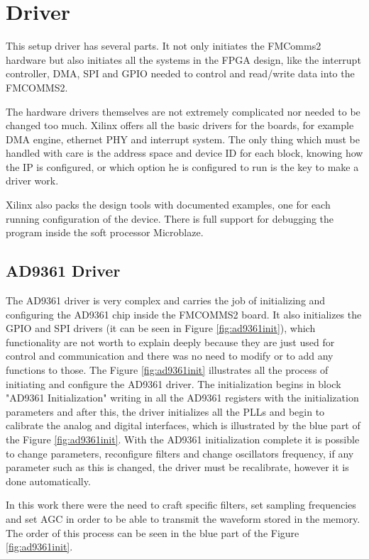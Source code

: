 \section{Driver}
\label{impl:driver}

This setup driver has several parts. It not only initiates the FMComms2 hardware
but also initiates all the systems in the FPGA design, like the interrupt
controller, DMA, SPI and GPIO needed to control and read/write data into the
FMCOMMS2.

The hardware drivers themselves are not extremely complicated nor needed to be
changed too much. Xilinx offers all the basic drivers for the boards, for
example DMA engine, ethernet PHY and interrupt system. The only thing which must
be handled with care is the address space and device ID for each block, knowing
how the IP is configured, or which option he is configured to run is the key to
make a driver work.

Xilinx also packs the design tools with documented examples, one for each
running configuration of the device. There is full support for debugging the
program inside the soft processor Microblaze.

\subsection{AD9361 Driver}

The AD9361 driver is very complex and carries the job of initializing and
configuring the AD9361 chip inside the FMCOMMS2 board. It also initializes the
GPIO and SPI drivers (it can be seen in Figure \ref{fig:ad9361init}), which
functionality are not worth to explain deeply because they are just used for
control and communication and there was no need to modify or to add any
functions to those. The Figure \ref{fig:ad9361init} illustrates all the process
of initiating and configure the AD9361 driver.
The initialization begins in block "AD9361 Initialization" writing in all the
AD9361 registers with the initialization parameters and after this, the driver
initializes all the PLLs and begin to calibrate the analog and digital
interfaces, which is illustrated by the blue part of the Figure
\ref{fig:ad9361init}. With the AD9361 initialization complete it is possible to
change parameters, reconfigure filters and  change oscillators frequency, if any
parameter such as this is changed, the driver must be recalibrate, however it is
done automatically.

In this work there were the need to craft specific filters, set sampling
frequencies and set AGC in order to be able to transmit the waveform stored in
the memory. The order of this process can be seen in the blue part of the Figure
\ref{fig:ad9361init}.

